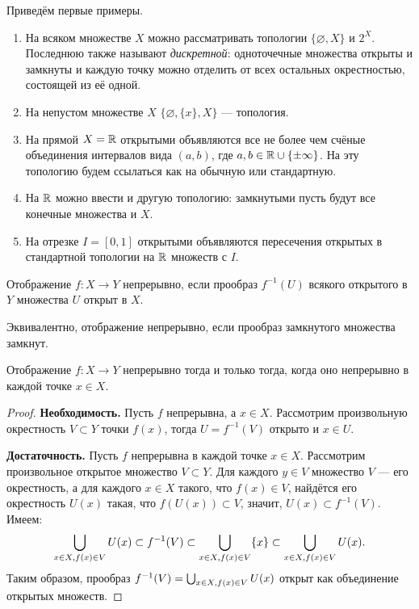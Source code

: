 Приведём первые примеры.
\begin{enumerate}
	\item На всяком множестве $X$ можно рассматривать топологии $\{\varnothing, X\}$ и $2^X$. Последнюю также называют \textit{дискретной}: одноточечные множества открыты и замкнуты и каждую точку можно отделить от всех остальных окрестностью, состоящей из её одной.
	\item На непустом множестве $X$ $\{\varnothing, \{x\}, X\}$ --- топология.
	\item На прямой $X=\mathbb {R}$ открытыми объявляются все не более чем счёные объединения интервалов вида $(a,b)$, где $a,b\in\mathbb {R}\cup\{\pm\infty\}$. На эту топологию будем ссылаться как на обычную или стандартную.
	\item На $\mathbb {R}$ можно ввести и другую топологию: замкнутыми пусть будут все конечные множества и $X$.
	\item На отрезке $I=[0,1]$ открытыми объявляются пересечения открытых в стандартной топологии на $\mathbb {R}$ множеств с $I$.
\end{enumerate}
\begin{defin}
	Отображение $f\colon X\to Y$ непрерывно, если прообраз $f^{-1}(U)$ всякого открытого в $Y$ множества $U$ открыт в $X$.
\end{defin}
Эквивалентно, отображение непрерывно, если прообраз замкнутого множества замкнут.
\begin{prop}
	Отображение $f\colon X\to Y$ непрерывно тогда и только тогда, когда оно непрерывно в каждой точке $x\in X$.
\end{prop}
\begin{proof}
	\textbf{Необходимость.} Пусть $f$ непрерывна, а $x\in X$. Рассмотрим произвольную окрестность $V\subset Y$ точки $f(x)$, тогда $U=f^{-1}(V)$ открыто и $x\in U$.

	\textbf{Достаточность.} Пусть $f$ непрерывна в каждой точке $x\in X$. Рассмотрим произвольное открытое множество $V\subset Y$. Для каждого $y\in V$ множество $V$ --- его окрестность, а для каждого $x\in X$ такого, что $f(x)\in V$, найдётся его окрестность $U(x)$ такая, что $f(U(x))\subset V$, значит, $U(x)\subset f^{-1}(V)$. Имеем:
		\begin{equation*}
			\bigcup_{x\in X,\newline f(x)\in V} U(x)\subset f^{-1}(V)\subset\bigcup_{x\in X, f(x)\in V}\{x\}\subset\bigcup_{x\in X, f(x)\in V} U(x).
		\end{equation*}
	Таким образом, прообраз $f^{-1}(V)=\bigcup_{x\in X,\newline f(x)\in V} U(x)$ открыт как объединение открытых множеств.
\end{proof}

